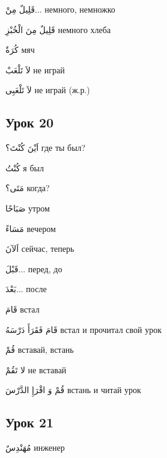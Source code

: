 \documentclass[a5paper]{article}
\newcommand\textstyleDropCaps[1]{#1}
\newcommand\textstyleCaptioncharacters[1]{#1}
\begin{document}
\textstyleCaptioncharacters{قَلِيلٌ مِنْ...ِ }\textstyleDropCaps{немного, не­множко‎}

\textstyleCaptioncharacters{قَلِيلٌ مِنَ الْخُبْزِ }\textstyleDropCaps{немного хлеба‎}

\textstyleCaptioncharacters{كُرَةٌ }\textstyleDropCaps{мяч‎}

\textstyleCaptioncharacters{لاَ تَلْعَبْ }\textstyleDropCaps{не играй‎}

\textstyleCaptioncharacters{لاَ تَلْعَبِى }\textstyleDropCaps{не играй (ж.р.)‎}

\subsection[Урок 20‎]{\textstyleDropCaps{Урок 20‎}}
\textstyleCaptioncharacters{اَيْنَ كُنْتَ؟ }\textstyleDropCaps{где ты был?‎}

\textstyleCaptioncharacters{كُنْتُ }\textstyleDropCaps{я был‎}

\textstyleCaptioncharacters{مَتَى؟ }\textstyleDropCaps{когда?‎}

\textstyleCaptioncharacters{صَبَاحًا }\textstyleDropCaps{утром‎}

\textstyleCaptioncharacters{مَسَاءً }\textstyleDropCaps{вечером‎}

\textstyleCaptioncharacters{اَلآنَ }\textstyleDropCaps{сейчас, теперь‎}

\textstyleCaptioncharacters{قَبْلَ...ِ }\textstyleDropCaps{перед, до‎}

\textstyleCaptioncharacters{بَعْدَ...ِ }\textstyleDropCaps{после‎}

\textstyleCaptioncharacters{قَامَ }\textstyleDropCaps{встал‎}

\textstyleCaptioncharacters{قَامَ فَقَرَأَ دَرْسَهُ }\textstyleDropCaps{встал и прочитал свой урок‎}

\textstyleCaptioncharacters{قُمْ }\textstyleDropCaps{вставай, встань‎}

\textstyleCaptioncharacters{لا تَقُمْ }\textstyleDropCaps{не вставай‎}

\textstyleCaptioncharacters{قُمْ وَ اقْرَإِ الدَّرْسَ }\textstyleDropCaps{встань и читай урок‎}

\subsection[Урок 21‎]{\textstyleDropCaps{Урок 21‎}}
\textstyleCaptioncharacters{مُهَنْدِسٌ }\textstyleDropCaps{инженер‎}
\end{document}
